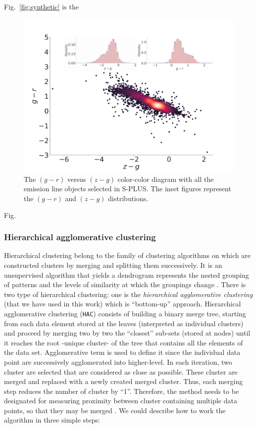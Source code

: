 \documentclass[fleqn,usenatbib]{mnras}
\begin{document}
Fig.~\ref{fig:synthetic} is the 

\begin{figure}
	\includegraphics[width=0.9\linewidth]{Figs/red-blue-colorObjects-gr-edit.jpg}
        \caption{The $(g - r)$ versus $(z - g)$ color-color diagram with all the emission line
          objects selected in S-PLUS. The inset figures represent the $(g - r)$ and  $(z - g)$
        distributions.}
    \label{fig:new-color}
\end{figure}


Fig.

\subsubsection{Hierarchical agglomerative clustering}
\label{sec:Hierar}

Hierarchical clustering belong to the family of clustering algorithms
on which are constructed clusters by merging and splitting them successively.
It is an unsupervised algorithm that yields a dendrogram
represents the nested grouping of patterns and the levels of similarity
at which the groupings change \citep{Jain:1999}. There is two type of hierarchical
clustering: one is the \textit{hierarchical agglomerative clustering} (that we have
used in this work) which is ``bottom-up'' approach. Hierarchical agglomerative
clustering (\texttt{HAC}) consists of building a binary merge tree, starting from 
each data element stored at the leaves (interpreted as individual clusters)
and proceed by merging two by two the ``closest'' sub-sets (stored at nodes)
until it reaches the root -unique cluster- of the tree that contains all the elements
of the data set. Agglomerative term is used  to define it since the individual data
point are successively agglomerated into higher-level. In each  iteration, two cluster
are selected that are considered as close as possible. These cluster are merged and
replaced with a newly created merged cluster. Thus, each merging step reduces
the number of cluster by ``1''. Therefore, the method needs to be designated for
measuring proximity between cluster containing multiple data points, so that
they may be merged \citep{Mann:2013, Aggarwal:2015}. We could describe how to
work the algorithm in three simple steps:
\end{document}
